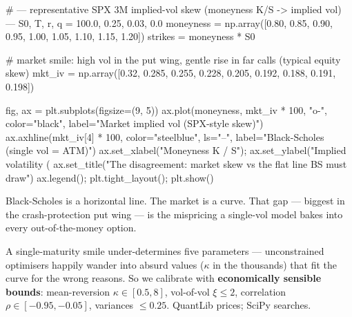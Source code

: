 \documentclass{pyportfolios-note}
\begin{document}
\begin{notecode}
# --- representative SPX 3M implied-vol skew (moneyness K/S -> implied vol) ---
S0, T, r, q = 100.0, 0.25, 0.03, 0.0
moneyness = np.array([0.80, 0.85, 0.90, 0.95, 1.00, 1.05, 1.10, 1.15, 1.20])
strikes   = moneyness * S0

# market smile: high vol in the put wing, gentle rise in far calls (typical equity skew)
mkt_iv = np.array([0.32, 0.285, 0.255, 0.228, 0.205, 0.192, 0.188, 0.191, 0.198])

fig, ax = plt.subplots(figsize=(9, 5))
ax.plot(moneyness, mkt_iv * 100, "o-", color="black", label="Market implied vol (SPX-style skew)")
ax.axhline(mkt_iv[4] * 100, color="steelblue", ls="--", label="Black-Scholes (single vol = ATM)")
ax.set_xlabel("Moneyness  K / S"); ax.set_ylabel("Implied volatility (%
ax.set_title("The disagreement: market skew vs the flat line BS must draw")
ax.legend(); plt.tight_layout(); plt.show()
\end{notecode}

Black-Scholes is a horizontal line. The market is a curve. That gap — biggest in
the crash-protection put wing — is the mispricing a single-vol model bakes into
every out-of-the-money option.


A single-maturity smile under-determines five parameters — unconstrained
optimisers happily wander into absurd values ($\kappa$ in the thousands) that fit
the curve for the wrong reasons. So we calibrate with \textbf{economically
sensible bounds}: mean-reversion $\kappa \in [0.5, 8]$, vol-of-vol
$\xi \leq 2$, correlation $\rho \in [-0.95, -0.05]$, variances $\leq 0.25$.
QuantLib prices; SciPy searches.
\end{document}
